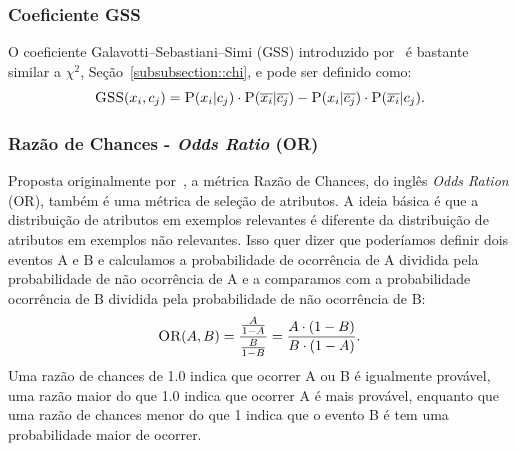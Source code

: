 \subsubsection{Coeficiente GSS}
\label{subsubsection::gss}
O coeficiente Galavotti–Sebastiani–Simi (GSS) introduzido por~\cite{Galavotti00} é bastante similar a $\chi^2$, Seção~\ref{subsubsection::chi}, e pode ser definido como:
\begin{equation}\label{eqn::gss}
   \textsc{GSS}(x_i, c_j) = \textsc{P}(x_i|c_j) \cdot \textsc{P}(\overline{x_i}|\overline{c_j}) - \textsc{P}(x_i|\overline{c_j}) \cdot \textsc{P}(\overline{x_i}|c_j).
\end{equation}


\subsubsection{Razão de Chances - \textit{Odds Ratio} (OR)}
\label{subsubsection::or}

Proposta originalmente por~\cite{Rijsbergen79}, a métrica Razão de Chances, do inglês \textit{Odds Ration} (\textsc{OR}), também é uma métrica de seleção de atributos. A ideia básica é que a distribuição de atributos em exemplos relevantes é diferente da distribuição de atributos em exemplos não relevantes. Isso quer dizer que poderíamos definir dois eventos A e B e calculamos a probabilidade de ocorrência de A dividida pela probabilidade de não ocorrência de A e a comparamos com a probabilidade ocorrência de B dividida pela probabilidade de não ocorrência de B:
\begin{equation}\label{eqn::or}
   \textsc{OR}(A, B) = \frac{\frac{A}{1-A}} {\frac{B}{1-B}} = \frac{ A \cdot ( 1 - B )} { B \cdot ( 1 - A ) } .
\end{equation}
Uma razão de chances de 1.0 indica que ocorrer A ou B é igualmente provável, uma razão maior do que 1.0 indica que ocorrer A é mais provável, enquanto que uma razão de chances menor do que 1 indica que o evento B é tem uma probabilidade maior de ocorrer.

